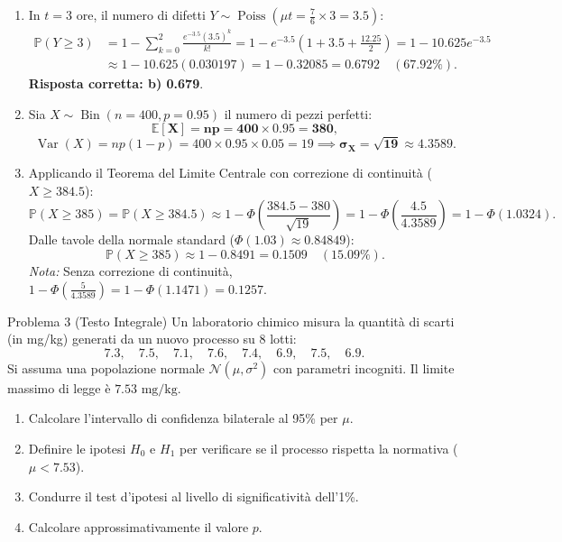 \documentclass[11pt,a4paper]{article}
\newcommand{\EE}{\mathbb{E}}
\newcommand{\Prob}{\mathbb{P}}
\newcommand{\Var}{\operatorname{Var}}
\begin{document}
\begin{soluzionebox}
\begin{enumerate}[label=(\alph*)]
    \item In $t = 3$ ore, il numero di difetti $Y \sim \operatorname{Poiss}(\mu t = \frac{7}{6} \times 3 = 3.5)$:
    \begin{align*}
    \Prob(Y \ge 3) &= 1 - \sum_{k=0}^2 \frac{e^{-3.5} (3.5)^k}{k!} = 1 - e^{-3.5}\left(1 + 3.5 + \frac{12.25}{2}\right) = 1 - 10.625 e^{-3.5} \\
    &\approx 1 - 10.625(0.030197) = 1 - 0.32085 = \mathbf{0.6792} \quad (\mathbf{67.92\%}).
    \end{align*}
    \textbf{Risposta corretta: b) 0.679}.

    \item Sia $X \sim \operatorname{Bin}(n=400, p=0.95)$ il numero di pezzi perfetti:
    \[
    \mathbf{\EE[X] = np = 400 \times 0.95 = 380},
    \]
    \[
    \Var(X) = np(1-p) = 400 \times 0.95 \times 0.05 = 19 \implies \mathbf{\sigma_X = \sqrt{19} \approx 4.3589}.
    \]

    \item Applicando il Teorema del Limite Centrale con correzione di continuità ($X \ge 384.5$):
    \[
    \Prob(X \ge 385) = \Prob(X \ge 384.5) \approx 1 - \Phi\left( \frac{384.5 - 380}{\sqrt{19}} \right) = 1 - \Phi\left( \frac{4.5}{4.3589} \right) = 1 - \Phi(1.0324).
    \]
    Dalle tavole della normale standard ($\Phi(1.03) \approx 0.84849$):
    \[
    \Prob(X \ge 385) \approx 1 - 0.8491 = \mathbf{0.1509} \quad (\mathbf{15.09\%}).
    \]
    \emph{Nota:} Senza correzione di continuità, $1 - \Phi\left(\frac{5}{4.3589}\right) = 1 - \Phi(1.1471) = 0.1257$.
\end{enumerate}
\end{soluzionebox}

\begin{problemabox}{Problema 3 (Testo Integrale)}
Un laboratorio chimico misura la quantità di scarti (in mg/kg) generati da un nuovo processo su 8 lotti:
\[
7.3, \quad 7.5, \quad 7.1, \quad 7.6, \quad 7.4, \quad 6.9, \quad 7.5, \quad 6.9.
\]
Si assuma una popolazione normale $\mathcal{N}(\mu, \sigma^2)$ con parametri incogniti. Il limite massimo di legge è $7.53\text{ mg/kg}$.
\begin{enumerate}[label=(\alph*)]
    \item Calcolare l'intervallo di confidenza bilaterale al 95\% per $\mu$.
    \item Definire le ipotesi $H_0$ e $H_1$ per verificare se il processo rispetta la normativa ($\mu < 7.53$).
    \item Condurre il test d'ipotesi al livello di significatività dell'1\%.
    \item Calcolare approssimativamente il valore $p$.
\end{enumerate}
\end{problemabox}
\end{document}
